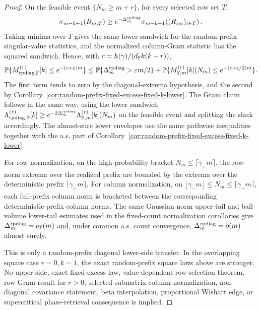 \begin{proof}
On the feasible event \(\{N_m\ge m+r\}\), for every selected row set \(T\),
\[
  \sigma_{m-k+1}(B_{m,T})
  \ge
  e^{-\Delta_m^{\rm rpdiag}}
  \sigma_{m-k+1}\!\left((R_{im})_{i\in T}\right).
\]
Taking minima over \(T\) gives the same lower sandwich for the random-prefix
singular-value statistics, and the normalized column-Gram statistic has the
squared sandwich.  Hence, with
\(c=h(\gamma)/(d_{\mathbb{F}} k(k+r))\),
\[
  \mathbb{P}\{M_{\rm rpdiag,\mathbb{F}}^{(r)}[k]\le e^{-(c+\varepsilon)m}\}
  \le
  \mathbb{P}\{\Delta_m^{\rm rpdiag}>\varepsilon m/2\}
  +\mathbb{P}\{M_{\mathbb{F},m}^{(r)}[k](N_m)\le e^{-(c+\varepsilon/2)m}\}.
\]
The first term tends to zero by the diagonal-extrema hypothesis, and the second
by Corollary~\ref{cor:random-prefix-fixed-excess-fixed-k-lower}.  The Gram
claim follows in the same way, using the lower sandwich
\(\Lambda_{\rm rpdiag,\mathbb{F}}^{(r)}[k]\ge
e^{-2\Delta_m^{\rm rpdiag}}\Lambda_{\mathbb{F},m}^{(r)}[k](N_m)\) on the feasible
event and splitting the slack accordingly.  The almost-sure lower envelopes use
the same pathwise inequalities together with the a.s. part of
Corollary~\ref{cor:random-prefix-fixed-excess-fixed-k-lower}.

For row normalization, on the high-probability bracket
\(N_m\le\lceil\gamma_+m\rceil\), the row-norm extrema over the realized prefix
are bounded by the extrema over the deterministic prefix
\(\lceil\gamma_+m\rceil\).  For column normalization, on
\(\lfloor\gamma_-m\rfloor\le N_m\le\lceil\gamma_+m\rceil\), each full-prefix
column norm is bracketed between the corresponding deterministic-prefix column
norms.  The same Gaussian norm upper-tail and ball-volume lower-tail estimates
used in the fixed-count normalization corollaries give
\(\Delta_m^{\rm rpdiag}=o_{\mathbb{P}}(m)\) and, under common a.s. count convergence,
\(\Delta_m^{\rm rpdiag}=o(m)\) almost surely.

This is only a random-prefix diagonal lower-side transfer.  In the overlapping
square case \(r=0,k=1\), the exact random-prefix square laws above are stronger.
No upper side, exact fixed-excess law, value-dependent row-selection theorem,
row-Gram result for \(r>0\), selected-submatrix column normalization,
non-diagonal covariance statement, beta interpolation, proportional Wishart
edge, or supercritical phase-retrieval consequence is implied.
\end{proof}

